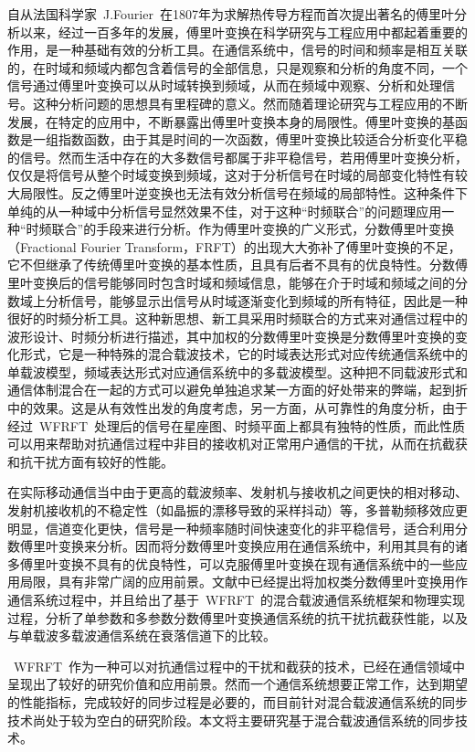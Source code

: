 自从法国科学家~J.Fourier~在1807年为求解热传导方程而首次提出著名的傅里叶分析以来，经过一百多年的发展，傅里叶变换在科学研究与工程应用中都起着重要的作用，是一种基础有效的分析工具。在通信系统中，信号的时间和频率是相互关联的，在时域和频域内都包含着信号的全部信息，只是观察和分析的角度不同，一个信号通过傅里叶变换可以从时域转换到频域，从而在频域中观察、分析和处理信号。这种分析问题的思想具有里程碑的意义。然而随着理论研究与工程应用的不断发展，在特定的应用中，不断暴露出傅里叶变换本身的局限性。傅里叶变换的基函数是一组指数函数，由于其是时间的一次函数，傅里叶变换比较适合分析变化平稳的信号。然而生活中存在的大多数信号都属于非平稳信号，若用傅里叶变换分析，仅仅是将信号从整个时域变换到频域，这对于分析信号在时域的局部变化特性有较大局限性。反之傅里叶逆变换也无法有效分析信号在频域的局部特性。这种条件下单纯的从一种域中分析信号显然效果不佳，对于这种“时频联合”的问题理应用一种“时频联合”的手段来进行分析。作为傅里叶变换的广义形式，分数傅里叶变换（Fractional Fourier Transform，FRFT）的出现大大弥补了傅里叶变换的不足，它不但继承了传统傅里叶变换的基本性质，且具有后者不具有的优良特性。分数傅里叶变换后的信号能够同时包含时域和频域信息，能够在介于时域和频域之间的分数域上分析信号，能够显示出信号从时域逐渐变化到频域的所有特征，因此是一种很好的时频分析工具。这种新思想、新工具采用时频联合的方式来对通信过程中的波形设计、时频分析进行描述，其中加权的分数傅里叶变换是分数傅里叶变换的变化形式，它是一种特殊的混合载波技术，它的时域表达形式对应传统通信系统中的单载波模型，频域表达形式对应通信系统中的多载波模型。这种把不同载波形式和通信体制混合在一起的方式可以避免单独追求某一方面的好处带来的弊端，起到折中的效果。这是从有效性出发的角度考虑，另一方面，从可靠性的角度分析，由于经过~WFRFT~处理后的信号在星座图、时频平面上都具有独特的性质，而此性质可以用来帮助对抗通信过程中非目的接收机对正常用户通信的干扰，从而在抗截获和抗干扰方面有较好的性能。

在实际移动通信当中由于更高的载波频率、发射机与接收机之间更快的相对移动、发射机接收机的不稳定性（如晶振的漂移导致的采样抖动）等，多普勒频移效应更明显，信道变化更快，信号是一种频率随时间快速变化的非平稳信号，适合利用分数傅里叶变换来分析。因而将分数傅里叶变换应用在通信系统中，利用其具有的诸多傅里叶变换不具有的优良特性，可以克服傅里叶变换在现有通信系统中的一些应用局限，具有非常广阔的应用前景。文献中\cite{mei2017_38_44}已经提出将加权类分数傅里叶变换用作通信系统过程中，并且给出了基于~WFRFT~的混合载波通信系统框架和物理实现过程，分析了单参数和多参数分数傅里叶变换通信系统的抗干扰抗截获性能，以及与单载波多载波通信系统在衰落信道下的比较。

~WFRFT~作为一种可以对抗通信过程中的干扰和截获的技术，已经在通信领域中呈现出了较好的研究价值和应用前景。然而一个通信系统想要正常工作，达到期望的性能指标，完成较好的同步过程是必要的，而目前针对混合载波通信系统的同步技术尚处于较为空白的研究阶段。本文将主要研究基于混合载波通信系统的同步技术。

